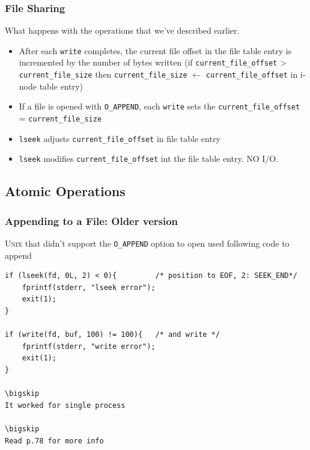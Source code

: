 \documentclass[newPxFont,sthlmFooter,nooffset]{beamer}
\begin{document}
\begin{frame}[t]
  \frametitle{File Sharing}
What happens with the operations that we've described earlier.
\begin{itemize}
\item After each \texttt{write} completes, the current file offset in the file table entry is incremented by the number of bytes written (if \texttt{current\_file\_offset} > \texttt{current\_file\_size} then \texttt{current\_file\_size} $\leftarrow$ \texttt{current\_file\_offset} in i-node table entry)
\item If a file is opened with \texttt{O\_APPEND}, each \texttt{write} sets the \texttt{current\_file\_offset} = \texttt{current\_file\_size}
\item \texttt{lseek} adjusts \texttt{current\_file\_offset} in file table entry
\item \texttt{lseek} modifies \texttt{current\_file\_offset} int the file table entry. NO I/O.
\end{itemize}
\end{frame}

\subsection{Atomic Operations}

\begin{frame}[containsverbatim,t]
  \frametitle{Appending to a  File: Older version}

\textsc{Unix} that didn't support the \texttt{O\_APPEND} option to open used following code to append

\begin{lstlisting}
if (lseek(fd, 0L, 2) < 0){         /* position to EOF, 2: SEEK_END*/
    fprintf(stderr, "lseek error");
    exit(1);
}

if (write(fd, buf, 100) != 100){   /* and write */
    fprintf(stderr, "write error");  
    exit(1);
}

\bigskip
It worked for single process 

\bigskip
Read p.78 for more info
\end{lstlisting}
\end{frame}
\end{document}
